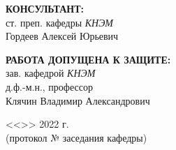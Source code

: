 \begin{center}
\vspace{0pt plus1fill} %

\hfill\begin{minipage}{0.55\textwidth}
			\textbf{КОНСУЛЬТАНТ:} \\
			ст. преп. кафедры \textit{КНЭМ} \\
			Гордеев Алексей Юрьевич \\
			\underline{\hspace{\textwidth}}
		\end{minipage}
%

\vspace{0pt plus1fill} %

\hfill\begin{minipage}{0.55\textwidth}
			\textbf{РАБОТА ДОПУЩЕНА К ЗАЩИТЕ:} \\
			зав. кафедрой \textit{КНЭМ} \\
			д.ф.-м.н., профессор \\
			Клячин Владимир Александрович \\
			\underline{\hspace{\textwidth}}
		\end{minipage}
%

\vspace{0pt plus2fill} %

\hfill\begin{minipage}{0.55\textwidth}
			<<\underline{\hspace{1cm}}>> \underline{\hspace{3cm}} 2022 г. \\
			(протокол № \underline{\hspace{1cm}} заседания кафедры)
		\end{minipage}
%

\vspace{0pt plus4fill} %
\end{center}
%
{\centering\textbf{\thesisCity}\  \textbf{\thesisYear}\par}